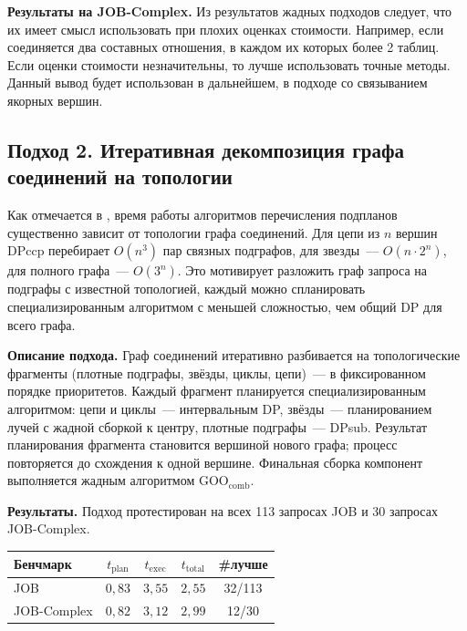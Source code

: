 \textbf{Результаты на JOB-Complex.}
Из результатов жадных подходов следует, что их имеет смысл использовать при плохих оценках стоимости.
Например, если соединяется два составных отношения, в каждом их которых более 2 таблиц.
Если оценки стоимости незначительны, то лучше использовать точные методы.
Данный вывод будет использован в дальнейшем, в подходе со связыванием якорных вершин.
\par

\subsection{Подход 2. Итеративная декомпозиция графа соединений на топологии}

Как отмечается в \cite{SizeSub, Adaptive}, время работы алгоритмов перечисления
подпланов существенно зависит от топологии графа соединений.
Для цепи из $n$ вершин DPccp перебирает $O(n^3)$ пар связных подграфов,
для звезды~--- $O(n \cdot 2^n)$, для полного графа~--- $O(3^n)$.
Это мотивирует разложить граф запроса на подграфы
с известной топологией, каждый можно спланировать специализированным алгоритмом
с меньшей сложностью, чем общий DP для всего графа.
\par

\textbf{Описание подхода.}
Граф соединений итеративно разбивается на топологические фрагменты
(плотные подграфы, звёзды, циклы, цепи)~--- в фиксированном порядке приоритетов.
Каждый фрагмент планируется специализированным алгоритмом: цепи и циклы~---
интервальным DP, звёзды~--- планированием лучей с жадной сборкой к центру,
плотные подграфы~--- DPsub. Результат планирования фрагмента становится 
вершиной нового графа; процесс повторяется до схождения к
одной вершине. Финальная сборка компонент выполняется жадным
алгоритмом $\mathrm{GOO_{comb}}$.
\par

\textbf{Результаты.}
Подход протестирован на всех 113 запросах JOB и 30 запросах JOB-Complex.

\begin{center}
\begin{tabular}{l c c c c}
Бенчмарк & $t_{\mathrm{plan}}$ & $t_{\mathrm{exec}}$ & $t_{\mathrm{total}}$ & \#лучше \\
\hline
JOB         & $0{,}83$ & $3{,}55$ & $2{,}55$ & 32/113 \\
JOB-Complex & $0{,}82$ & $3{,}12$ & $2{,}99$ & 12/30 \\
\end{tabular}
\end{center}


